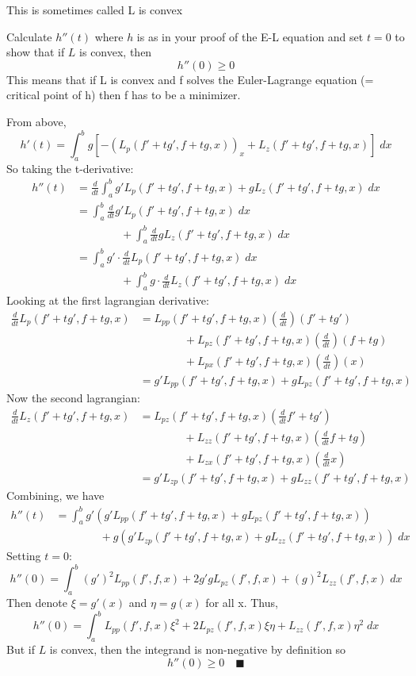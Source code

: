 \documentclass[12pt]{article}
\newcommand{\qed}{\quad \blacksquare}
\begin{document}
This is sometimes called L is convex

Calculate $h''(t)$ where $h$ is as in your proof of the E-L equation and set $t = 0$ to show that if $L$ is convex, then \[h''(0) \geq 0\]
This means that if L is convex and f solves the Euler-Lagrange equation (= critical point of h) then f has to be a minimizer.

\color{blue}
From above, 
\[h'(t) = \int_a^b g [-(L_p(f' + tg', f+ tg, x))_x + L_z(f' + tg', f + tg, x)]\; dx\]
So taking the t-derivative:
\begin{align*}
    h''(t) &= \frac{d}{dt}\int_a^b g'L_p(f' + tg', f + tg, x) + gL_z(f' + tg', f + tg, x)\; dx\\
    &= \int_a^b \frac{d}{dt}g'L_p(f' + tg', f + tg, x)\; dx\\
    &\qquad \qquad + \int_a^b \frac{d}{dt}gL_z(f' + tg', f + tg, x)\; dx\\
    &= \int_a^b g' \cdot \frac{d}{dt} L_p(f' + tg', f + tg, x)\; dx\\
    &\qquad \qquad + \int_a^b g\cdot \frac{d}{dt}L_z(f' + tg', f + tg, x)\; dx
\end{align*}
Looking at the first lagrangian derivative:
\begin{align*}
    \frac{d}{dt} L_p(f' + tg', f + tg, x) &= L_{pp}(f' + tg', f + tg, x)(\frac{d}{dt})(f' + tg') \\
    &\qquad \qquad + L_{pz}(f' + tg', f + tg, x)(\frac{d}{dt})(f + tg)\\
    &\qquad \qquad + L_{px}(f' + tg', f + tg, x)(\frac{d}{dt})(x)\\
    &= g'L_{pp}(f' + tg', f + tg, x) + gL_{pz}(f' + tg', f + tg, x)
\end{align*}
Now the second lagrangian:
\begin{align*}
    \frac{d}{dt}L_z(f' + tg', f + tg, x) &= L_{pz}(f' + tg', f + tg, x)(\frac{d}{dt} f'+ tg')\\
    &\qquad \qquad + L_{zz}(f' + tg', f + tg, x)(\frac{d}{dt} f+ tg)\\
    &\qquad \qquad + L_{zx}(f' + tg', f + tg, x)(\frac{d}{dt} x)\\
    &= g'L_{zp}(f' + tg', f + tg, x) + g L_{zz}(f' + tg', f + tg, x)
\end{align*}
Combining, we have 
\begin{align*}
    h''(t) &= \int_a^b g'(g'L_{pp}(f' + tg', f + tg, x) + gL_{pz}(f' + tg', f + tg, x))\\
    &\qquad \qquad + g(g'L_{zp}(f' + tg', f + tg, x) + g L_{zz}(f' + tg', f + tg, x))\; dx
\end{align*}
Setting $t=0$:
\[h''(0) = \int_a^b (g')^2 L_{pp}(f', f, x) + 2g'gL_{pz}(f', f, x) + (g)^2 L_{zz}(f', f, x)\; dx\]
Then denote $\xi = g'(x)$ and $\eta = g(x)$ for all x. Thus, 
\[h''(0) = \int_a^b L_{pp}(f', f, x)\xi^2 + 2L_{pz}(f', f, x)\xi \eta + L_{zz}(f' ,f, x)\eta^2\; dx\]
But if $L$ is convex, then the integrand is non-negative by definition so 
\[h''(0) \geq 0 \qed\]
\color{black}
\pagebreak
\end{document}
